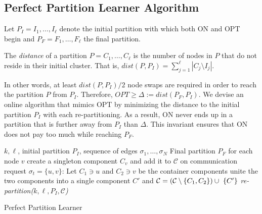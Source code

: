 \subsection{Perfect Partition Learner Algorithm}



Let $P_I = I_1, \dots, I_{\ell}$ denote the initial partition with which both ON and OPT begin and
$P_F = F_1, \dots, F_{\ell}$ the final partition.
\begin{definition}	\label{def:dist}
	The \emph{distance} of a partition $P = C_1, \dots, C_{\ell}$ is the number of nodes in $P$ that do not reside in their initial cluster.
	That is,
	$dist(P, P_I) = \sum_{j=1}^{\ell} | C_j \setminus I_j |$. 
\end{definition}

In other words,
at least $dist(P, P_I)/2$ node swaps are required in order to reach the partition $P$ from $P_I$.
Therefore,
$OPT \geq \Delta:= dist(P_F, P_I) $.
We devise an online algorithm that mimics OPT by minimizing the distance to the initial partition $P_I$ with each re-partitioning.
As a result,
ON never ends up in a partition that is further away from $P_I$ than $\Delta$.
This invariant ensures that ON does not pay too much while reaching $P_F$.

\begin{algorithm}
	\renewcommand{\algorithmicrequire}{\textbf{Input:}}
	\renewcommand{\algorithmicensure}{\textbf{Output:}}
	\begin{algorithmic}[1]
		\Require 
		$k, \ell$,
		initial partition $P_I$,
		sequence of  edges $\sigma_1, \dots, \sigma_N$ 
		\Ensure Final partition $P_F$ 
		\State for each node $v$ create a singleton component $C_v$ and add it to $\mathcal{C}$ \label{line:initcomponents}
		\State on communication request $\sigma_t=\{u,v\}$:
		\State Let $C_1 \ni u$ and $C_2 \ni v$ be the container components
		\State unite the two components into a single component $C'$ and
		$\mathcal{C} = (\mathcal{C}\setminus\{C_1, C_2\}) \cup ~\{C'\}$ \label{line:mergecomponents}
		\State \textit{re-partition($k, \ell, P_I, \mathcal{C}$)} \label{line:rebalance} 
		\EndIf
		\EndIf
	\end{algorithmic}
	\caption{Perfect Partition Learner}
	\label{alg:ppl}
      \end{algorithm}


